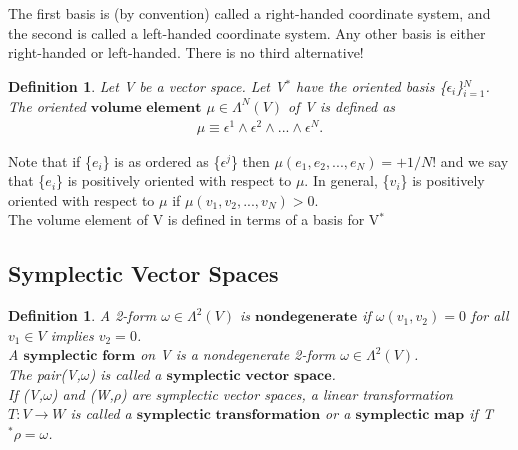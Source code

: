 \documentclass[12pt,a4paper]{article}
\newtheorem{defn}[thm]{Definition}
\begin{document}
The first basis is (by convention) called a right-handed coordinate system,
and the second is called a left-handed coordinate system. Any other basis
is either right-handed or left-handed. There is no third alternative!

\begin{defn}
Let V be a vector space. Let V$^{*}$ have the oriented basis \{$\epsilon_i$\}$^N_{i=1}$. The oriented $\textbf{volume element}$ $\mu \in \Lambda^{N}(V)$ of V is defined as
\begin{eqnarray*}
\mu \equiv \epsilon^1 \wedge \epsilon^2 \wedge ... \wedge \epsilon^N.
\end{eqnarray*}
\end{defn}
\indent Note that if \{$e_i$\} is as ordered as \{$\epsilon^j$\} then $\mu( e_1, e_2, ... , e_N) = +1/N!$ and we say that \{$e_i$\} is positively oriented with respect to $\mu$. In general, \{$v_i$\}  is
positively oriented with respect to $\mu$ if $\mu(v_1, v_2, ... , v_N) > 0$. \\ The volume element of V is defined in terms of a basis for V$^*$
\subsection{Symplectic Vector Spaces}

\begin{defn}
A 2-form $\omega \in \Lambda^{2}(V)$ is $\textbf{nondegenerate}$ if $\omega(v_1, v_2) = 0$ for all $v_1 \in V$ implies $v_2 = 0$. \\A $\textbf{symplectic form}$ on V is a nondegenerate
2-form $\omega \in \Lambda^{2}(V)$. \\The pair(V,$\omega$) is called a $\textbf{symplectic vector space}$.\\
If (V,$\omega$) and (W,$\rho$) are symplectic vector spaces, a linear transformation $T:V \to W$ is called a $\textbf{symplectic transformation}$ or a $\textbf{symplectic map}$ if T$^* \rho = \omega$.
\end{defn}
\end{document}
